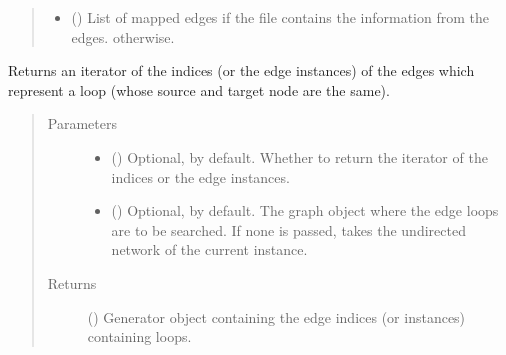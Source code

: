 \documentclass[letterpaper,10pt,english]{sphinxmanual}
\begin{document}
\begin{fulllineitems}
\begin{fulllineitems}
\begin{quote}
\begin{description}
\begin{itemize}
\item {} 
() \textendash{} List of mapped edges if the file contains the
information from the edges. \sphinxcode{\sphinxupquote{{[}{]}}} otherwise.

\end{itemize}


\end{description}\end{quote}

\end{fulllineitems}


\begin{fulllineitems}
\label{\detokenize{main:pypath.main.PyPath.loop_edges}}
Returns an iterator of the indices (or the edge instances) of
the edges which represent a loop (whose source and target node
are the same).
\begin{quote}\begin{description}
\item[{Parameters}] \leavevmode\begin{itemize}
\item {} 
 () \textendash{} Optional,  by default. Whether to return the
iterator of the indices or the edge instances.

\item {} 
 () \textendash{} Optional,  by default. The graph object where the
edge loops are to be searched. If none is passed, takes the
undirected network of the current instance.

\end{itemize}

\item[{Returns}] \leavevmode
() \textendash{} Generator object containing the edge
indices (or instances) containing loops.

\end{description}\end{quote}

\end{fulllineitems}


\end{fulllineitems}
\end{document}
